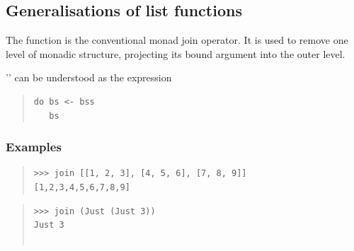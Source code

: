 \subsection{Generalisations of list functions}
\begin{haddockdesc}
\item[\begin{tabular}{@{}l}
join :: Monad m => m (m a) -> m a
\end{tabular}]
{\haddockbegindoc
The  function is the conventional monad join operator. It
 is used to remove one level of monadic structure, projecting its
 bound argument into the outer level.\par
'' can be understood as the  expression\par
\begin{quote}
{\haddockverb\begin{verbatim}
do bs <- bss
   bs
\end{verbatim}}
\end{quote}
\subsubsection*{\textbf{Examples}}
\begin{quote}
{\haddockverb\begin{verbatim}
>>> join [[1, 2, 3], [4, 5, 6], [7, 8, 9]]
[1,2,3,4,5,6,7,8,9]

\end{verbatim}}
\end{quote}
\begin{quote}
{\haddockverb\begin{verbatim}
>>> join (Just (Just 3))
Just 3


\end{verbatim}}
\end{quote}}
\end{haddockdesc}
